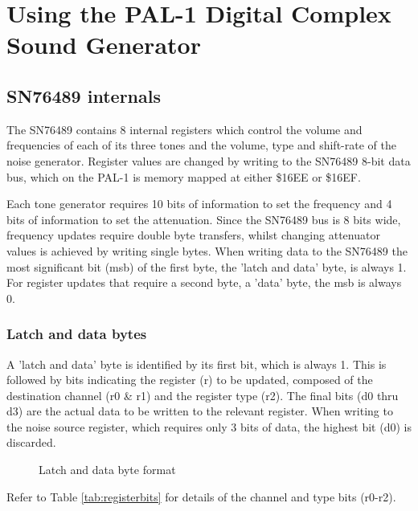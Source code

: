\documentclass[a4paper,11pt,twoside,openright]{report}
\begin{document}
\chapter{Using the PAL-1 Digital Complex Sound Generator}

\section*{SN76489 internals}
The SN76489 contains 8 internal registers which control the volume and frequencies of each of 
its three tones and the volume, type and shift-rate of the noise generator. Register values are 
changed by writing to the SN76489 8-bit data bus, which on the PAL-1 is memory mapped at either
\$16EE or \$16EF. 

Each tone generator requires 10 bits of information to set the frequency and 4 bits of 
information to set the attenuation. Since the SN76489 bus is 8 bits wide, frequency updates
require double byte transfers, whilst changing attenuator values is achieved by writing 
single bytes. When writing data to the SN76489 the most significant bit (msb) of the first 
byte, the 'latch and data' byte, is always 1. For register updates that require a second byte, 
a 'data' byte, the msb is always 0.

\subsection*{Latch and data bytes}
A 'latch and data' byte is identified by its first bit, which is always 1. This is followed by
bits indicating the register (r) to be updated, composed of the destination channel (r0 \& r1) 
and the register type (r2). The final bits (d0 thru d3) are the actual data to be written 
to the relevant register. When writing to the noise source register, which requires only 3 bits 
of data, the highest bit (d0) is discarded.

\begin{figure}[h!]
\centering	
{}
\caption{Latch and data byte format}
\end{figure}

Refer to Table \ref{tab:registerbits} for details of the channel and type bits
(r0-r2).
\end{document}
